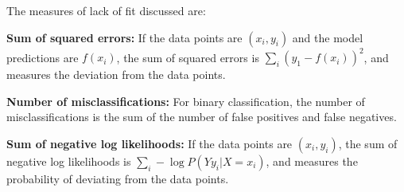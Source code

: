 \documentclass{article}
\begin{document}
\clearpage
\problem{}
The measures of lack of fit discussed are:

\textbf{Sum of squared errors:} If the data points are $(x_i, y_i)$ and the model predictions are $f(x_i)$, the sum of squared errors is $\sum_i (y_1 - f(x_i))^2$, and measures the deviation from the data points.

\textbf{Number of misclassifications:} For binary classification, the number of misclassifications is the sum of the number of false positives and false negatives.

\textbf{Sum of negative log likelihoods:} If the data points are $(x_i, y_i)$, the sum of negative log likelihoods is $\sum_i -\log P(Y  y_i | X = x_i)$, and measures the probability of deviating from the data points.
\end{document}
